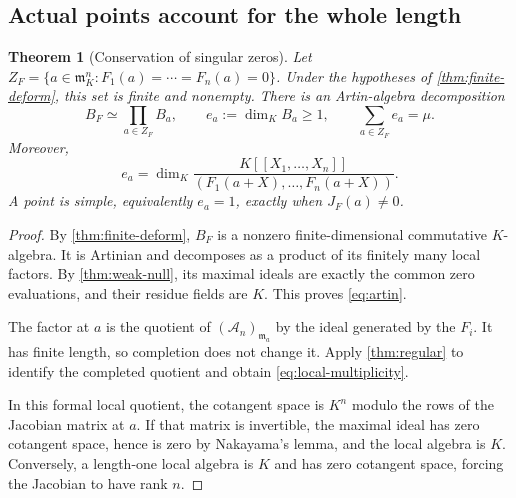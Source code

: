 \documentclass[11pt,letterpaper]{article}
\newtheorem{theorem}{Theorem}[section]
\theoremstyle{definition}
\theoremstyle{remark}
\newcommand{\A}{\mathscr A}
\newcommand{\m}{\mathfrak m}
\numberwithin{equation}{section}
\begin{document}
\subsection{Actual points account for the whole length}
\begin{theorem}[Conservation of singular zeros]\label{thm:zeros}
Let $Z_F=\{a\in\m_K^n:F_1(a)=\cdots=F_n(a)=0\}$. Under the hypotheses of \cref{thm:finite-deform}, this set is finite and nonempty. There is an Artin-algebra decomposition
\begin{equation}\label{eq:artin}
 B_F\simeq\prod_{a\in Z_F}B_a,
 \qquad e_a:=\dim_K B_a\ge1,
 \qquad \sum_{a\in Z_F}e_a=\mu.
\end{equation}
Moreover,
\begin{equation}\label{eq:local-multiplicity}
 e_a=\dim_K\frac{K[[X_1,\ldots,X_n]]}
 {(F_1(a+X),\ldots,F_n(a+X))}.
\end{equation}
A point is simple, equivalently $e_a=1$, exactly when $J_F(a)\ne0$.
\end{theorem}
\begin{proof}
By \cref{thm:finite-deform}, $B_F$ is a nonzero finite-dimensional commutative $K$-algebra. It is Artinian and decomposes as a product of its finitely many local factors. By \cref{thm:weak-null}, its maximal ideals are exactly the common zero evaluations, and their residue fields are $K$. This proves \eqref{eq:artin}.

The factor at $a$ is the quotient of $(\A_n)_{\m_a}$ by the ideal generated by the $F_i$. It has finite length, so completion does not change it. Apply \cref{thm:regular} to identify the completed quotient and obtain \eqref{eq:local-multiplicity}.

In this formal local quotient, the cotangent space is $K^n$ modulo the rows of the Jacobian matrix at $a$. If that matrix is invertible, the maximal ideal has zero cotangent space, hence is zero by Nakayama's lemma, and the local algebra is $K$. Conversely, a length-one local algebra is $K$ and has zero cotangent space, forcing the Jacobian to have rank $n$.
\end{proof}
\end{document}
